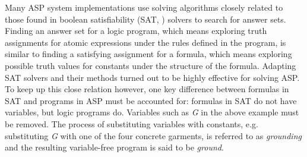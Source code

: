 \documentclass{vutinfth} %
\begin{document}

Many ASP system implementations use solving algorithms closely related to those found in boolean satisfiability (SAT, \cite{sat}) solvers to search for answer sets. Finding an answer set for a logic program, which means exploring truth assignments for atomic expressions under the rules defined in the program, is similar to finding a satisfying assignment for a formula, which means exploring possible truth values for constants under the structure of the formula. Adapting SAT solvers and their methods turned out to be highly effective for solving ASP. To keep up this close relation however, one key difference between formulas in SAT and programs in ASP must be accounted for: formulas in SAT do not have variables, but logic programs do. Variables such as \emph{G} in the above example must be removed. The process of substituting variables with constants, e.g. substituting \emph{G} with one of the four concrete garments, is referred to as \emph{grounding} and the resulting variable-free program is said to be \emph{ground}.
\end{document}
